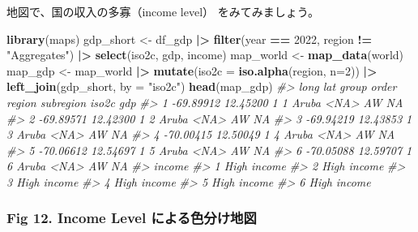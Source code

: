 \documentclass[
  xelatex, ja=standard]{bxjsbook}
\newenvironment{Shaded}{\begin{snugshade}}{\end{snugshade}}
\newcommand{\AttributeTok}[1]{\textcolor[rgb]{0.13,0.29,0.53}{#1}}
\newcommand{\CommentTok}[1]{\textcolor[rgb]{0.56,0.35,0.01}{\textit{#1}}}
\newcommand{\DecValTok}[1]{\textcolor[rgb]{0.00,0.00,0.81}{#1}}
\newcommand{\FunctionTok}[1]{\textcolor[rgb]{0.13,0.29,0.53}{\textbf{#1}}}
\newcommand{\NormalTok}[1]{#1}
\newcommand{\OtherTok}[1]{\textcolor[rgb]{0.56,0.35,0.01}{#1}}
\newcommand{\SpecialCharTok}[1]{\textcolor[rgb]{0.81,0.36,0.00}{\textbf{#1}}}
\newcommand{\StringTok}[1]{\textcolor[rgb]{0.31,0.60,0.02}{#1}}
\theoremstyle{definition}
\theoremstyle{definition}
\theoremstyle{definition}
\theoremstyle{definition}
\theoremstyle{remark}
\begin{document}
地図で、国の収入の多寡（income level） をみてみましょう。

\begin{Shaded}
\begin{Highlighting}[]
\FunctionTok{library}\NormalTok{(maps)}
\NormalTok{gdp\_short }\OtherTok{\textless{}{-}}\NormalTok{ df\_gdp }\SpecialCharTok{|\textgreater{}} \FunctionTok{filter}\NormalTok{(year }\SpecialCharTok{==} \DecValTok{2022}\NormalTok{, region }\SpecialCharTok{!=} \StringTok{"Aggregates"}\NormalTok{) }\SpecialCharTok{|\textgreater{}}
  \FunctionTok{select}\NormalTok{(iso2c, gdp, income)}
\NormalTok{map\_world }\OtherTok{\textless{}{-}} \FunctionTok{map\_data}\NormalTok{(}\StringTok{\textquotesingle{}world\textquotesingle{}}\NormalTok{)}
\NormalTok{map\_gdp }\OtherTok{\textless{}{-}}\NormalTok{ map\_world }\SpecialCharTok{|\textgreater{}} 
  \FunctionTok{mutate}\NormalTok{(}\AttributeTok{iso2c =} \FunctionTok{iso.alpha}\NormalTok{(region, }\AttributeTok{n=}\DecValTok{2}\NormalTok{)) }\SpecialCharTok{|\textgreater{}} 
  \FunctionTok{left\_join}\NormalTok{(gdp\_short, }\AttributeTok{by =} \StringTok{"iso2c"}\NormalTok{) }
\FunctionTok{head}\NormalTok{(map\_gdp)}
\CommentTok{\#\textgreater{}        long      lat group order region subregion iso2c gdp}
\CommentTok{\#\textgreater{} 1 {-}69.89912 12.45200     1     1  Aruba      \textless{}NA\textgreater{}    AW  NA}
\CommentTok{\#\textgreater{} 2 {-}69.89571 12.42300     1     2  Aruba      \textless{}NA\textgreater{}    AW  NA}
\CommentTok{\#\textgreater{} 3 {-}69.94219 12.43853     1     3  Aruba      \textless{}NA\textgreater{}    AW  NA}
\CommentTok{\#\textgreater{} 4 {-}70.00415 12.50049     1     4  Aruba      \textless{}NA\textgreater{}    AW  NA}
\CommentTok{\#\textgreater{} 5 {-}70.06612 12.54697     1     5  Aruba      \textless{}NA\textgreater{}    AW  NA}
\CommentTok{\#\textgreater{} 6 {-}70.05088 12.59707     1     6  Aruba      \textless{}NA\textgreater{}    AW  NA}
\CommentTok{\#\textgreater{}        income}
\CommentTok{\#\textgreater{} 1 High income}
\CommentTok{\#\textgreater{} 2 High income}
\CommentTok{\#\textgreater{} 3 High income}
\CommentTok{\#\textgreater{} 4 High income}
\CommentTok{\#\textgreater{} 5 High income}
\CommentTok{\#\textgreater{} 6 High income}
\end{Highlighting}
\end{Shaded}

\hypertarget{fig-12.-income-level-ux306bux3088ux308bux8272ux5206ux3051ux5730ux56f3}{%
\subsubsection{Fig 12. Income Level による色分け地図}\label{fig-12.-income-level-ux306bux3088ux308bux8272ux5206ux3051ux5730ux56f3}}
\end{document}
